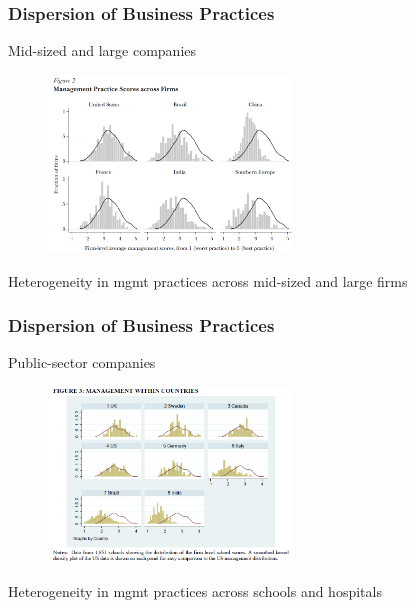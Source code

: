 \documentclass[hideothersubsections, usenames,dvipsnames,11pt]{beamer}
\newenvironment{itemize_2pt}{\itemize\addtolength{\itemsep}{2pt}}{\enditemize}
\begin{document}
\begin{frame}
\frametitle{Dispersion of Business Practices}

Mid-sized and large companies

\begin{figure}[htbp]
	\centering
	\includegraphics[width=17.4em]{pics/Bloom2010_mgmtdispersion.png}
	\label{Bloom(2010): Mgmt practices}
\end{figure}

\vspace{-1.0em}	

\begin{itemize_2pt}
	\item Heterogeneity in mgmt practices across mid-sized and large firms \textcolor{camel}{\citep{Bloom2007, Bloom2010, Syverson2011}}
\end{itemize_2pt}
\end{frame}


\begin{frame}
\frametitle{Dispersion of Business Practices}

Public-sector companies

\begin{figure}[htbp]
	\centering
	\includegraphics[width=17.4em]{pics/Bloom2015_mgmtdispersion.png}
	\label{Bloom(2015): Mgmt practices}
\end{figure}

\vspace{-1.0em}

\begin{itemize_2pt}
	\item Heterogeneity in mgmt practices across schools \citep{Bloom2015} and hospitals \citep{Bloom2020}
\end{itemize_2pt}
\end{frame}
\end{document}
